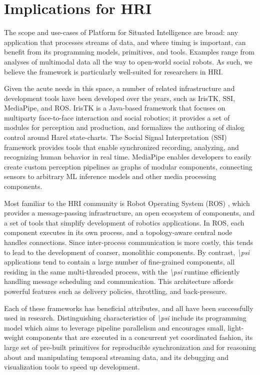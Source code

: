 \documentclass[letterpaper]{article} %
\newcommand{\psif}{\emph{\textbackslash psi} }
\begin{document}
\section{Implications for HRI}

The scope and use-cases of Platform for Situated Intelligence are broad: any application that processes streams of data, and where timing is important, can benefit from its programming models, primitives, and tools. Examples range from analyses of multimodal data all the way to open-world social robots. As such, we believe the framework is particularly well-suited for researchers in HRI.

Given the acute needs in this space, a number of related infrastructure and development tools have been developed over the years, such as IrisTK, SSI, MediaPipe, and ROS. IrisTK \cite{skantze2012iristk} is a Java-based framework that focuses on multiparty face-to-face interaction and social robotics; it provides a set of modules for perception and production, and formalizes the authoring of dialog control around Harel state-charts. The Social Signal Interpretation (SSI) framework \cite{wagner2013social} provides tools that enable synchronized recording, analyzing, and recognizing human behavior in real time. MediaPipe \cite{lugaresi2019mediapipe} enables developers to easily create custom perception pipelines as graphs of modular components, connecting sensors to arbitrary ML inference models and other media processing components.

Most familiar to the HRI community is Robot Operating System (ROS) \cite{Quigley09}, which provides a message-passing infrastructure, an open ecosystem of components, and a set of tools that simplify development of robotics applications. In ROS, each component executes in its own process, and a topology-aware central node handles connections. Since inter-process communication is more costly, this tends to lead to the development of coarser, monolithic components. By contrast, \psif applications tend to contain a large number of fine-grained components, all residing in the same multi-threaded process, with the \psif runtime efficiently handling message scheduling and communication. This architecture affords powerful features such as delivery policies, throttling, and back-pressure.

Each of these frameworks has beneficial attributes, and all have been successfully used in research. Distinguishing characteristics of \psif include its programming model which aims to leverage pipeline parallelism and encourages small, light-weight components that are executed in a concurrent yet coordinated fashion, its large set of pre-built primitives for reproducible synchronization and for reasoning about and manipulating temporal streaming data, and its debugging and visualization tools to speed up development.
\end{document}
